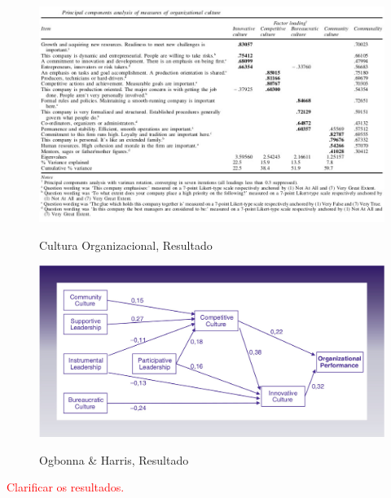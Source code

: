 {\begin{figure}[H]
\centering
\includegraphics[scale=.6]{"./image/OB/Culture.jpg"}\\
\caption{Cultura Organizacional, Resultado}
\label{grafico 2}
\end{figure}\par

\newpage
\begin{figure}[H]
\centering
\includegraphics[scale=.35]{"./image/OB/Ogbonna & Harris.jpg"}\\
\caption{Ogbonna \& Harris, Resultado}
\label{grafico 3}
\end{figure}\par

\textcolor{red}{Clarificar os resultados.}\\

}
